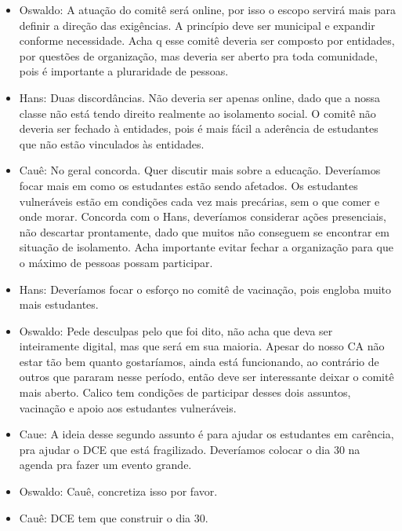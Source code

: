 \documentclass{ata-calico}
\begin{document}
\begin{itemize}
    \item Oswaldo: A atuação do comitê será online, por isso o escopo servirá mais para definir a direção das exigências. A princípio deve ser municipal e expandir conforme necessidade. Acha q esse comitê deveria ser composto por entidades, por questões de organização, mas deveria ser aberto pra toda comunidade, pois é importante a pluraridade de pessoas.
    
    \item Hans: Duas discordâncias. Não deveria ser apenas online, dado que a nossa classe não está tendo direito realmente ao isolamento social. O comitê não deveria ser fechado à entidades, pois é mais fácil a aderência de estudantes que não estão vinculados às entidades.
    
    \item Cauê: No geral concorda. Quer discutir mais sobre a educação. Deveríamos focar mais em como os estudantes estão sendo afetados. Os estudantes vulneráveis estão em condições cada vez mais precárias, sem o que comer e onde morar. Concorda com o Hans, deveríamos considerar ações presenciais, não descartar prontamente, dado que muitos não conseguem se encontrar em situação de isolamento. Acha importante evitar fechar a organização para que o máximo de pessoas possam participar.
    
    \item Hans: Deveríamos focar o esforço no comitê de vacinação, pois engloba muito mais estudantes.
    
    \item Oswaldo: Pede desculpas pelo que foi dito, não acha que deva ser inteiramente digital, mas que será em sua maioria. Apesar do nosso CA não estar tão bem quanto gostaríamos, ainda está funcionando, ao contrário de outros que pararam nesse período, então deve ser interessante deixar o comitê mais aberto. Calico tem condições de participar desses dois assuntos, vacinação e apoio aos estudantes vulneráveis.
    
    \item Caue: A ideia desse segundo assunto é para ajudar os estudantes em carência, pra ajudar o DCE que está fragilizado. Deveríamos colocar o dia 30 na agenda pra fazer um evento grande.
    
    \item Oswaldo: Cauê, concretiza isso por favor.
    
    \item Cauê: DCE tem que construir o dia 30.
    

\end{itemize}
\end{document}
